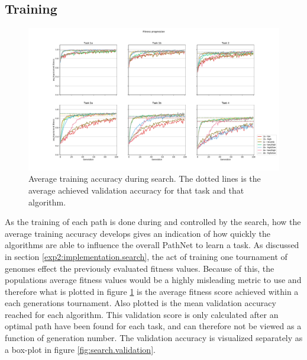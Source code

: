 \subsection{Training}
\begin{figure}[p!]
    \includegraphics[width=1.2\textwidth,center]{Chapters/4.Experiments/exp2/figures/Training_accuracy.pdf}
    \caption{Average training accuracy during search. The dotted lines is the average achieved validation accuracy for that task and that algorithm.}
    \label{fig:search.accuracy}
\end{figure}
As the training of each path is done during and controlled by the search, how the average training accuracy develops gives an indication of how quickly the algorithms are able to influence the overall PathNet to learn a task. As discussed in section \ref{exp2:implementation.search}, the act of training one tournament of genomes effect the previously evaluated fitness values. Because of this, the populations average fitness values would be a highly misleading metric to use and therefore what is plotted in figure \ref{fig:search.accuracy} is the average fitness score achieved within a each generations tournament. Also plotted is the mean validation accuracy reached for each algorithm. This validation score is only calculated after an optimal path have been found for each task, and can therefore not be viewed as a function of generation number. The validation accuracy is visualized separately as a box-plot in figure \ref{fig:search.validation}.

